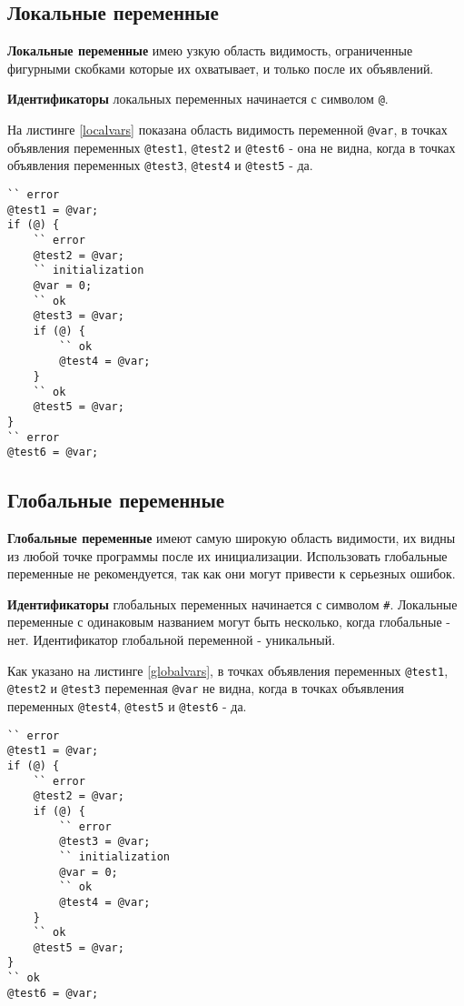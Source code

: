 \documentclass[a4paper, 14pt]{extarticle}
\begin{document}
\subsection{Локальные переменные}

\textbf{Локальные переменные} имею узкую область видимость, ограниченные фигурными скобками которые их охватывает, и только после их объявлений.

{\bf Идентификаторы} локальных переменных начинается с символом \lstinline`@`.

На листинге \ref{localvars} показана область видимость переменной \lstinline`@var`, в точках объявления переменных \lstinline`@test1`, \lstinline`@test2` и \lstinline`@test6` - она не видна, когда в точках объявления переменных \lstinline`@test3`, \lstinline`@test4` и \lstinline`@test5` - да.
\begin{lstlisting}[caption=Область видимости локальных перемен, label=localvars]
`` error
@test1 = @var;
if (@) {
	`` error
	@test2 = @var;
	`` initialization
	@var = 0;
	`` ok
	@test3 = @var;
	if (@) {
		`` ok
		@test4 = @var;
	}
	`` ok
	@test5 = @var;
}
`` error
@test6 = @var;
\end{lstlisting}

\subsection{Глобальные переменные}

\textbf{Глобальные переменные} имеют самую широкую область видимости, их видны из любой точке программы после их инициализации. Использовать глобальные переменные не рекомендуется, так как они могут привести к серьезных ошибок.

{\bf Идентификаторы} глобальных переменных начинается с символом {\color{blue2}\lstinline`#`}. Локальные переменные с одинаковым названием могут быть несколько, когда глобальные - нет. Идентификатор глобальной переменной - уникальный.

Как указано на листинге \ref{globalvars}, в точках объявления переменных \lstinline`@test1`, \lstinline`@test2` и \lstinline`@test3` переменная \lstinline`@var` не видна, когда в точках объявления переменных \lstinline`@test4`, \lstinline`@test5` и \lstinline`@test6` - да.

\begin{lstlisting}[caption=Область видимости глобальных перемен, label=globalvars]
`` error
@test1 = @var;
if (@) {
	`` error
	@test2 = @var;
	if (@) {
		`` error
		@test3 = @var;
		`` initialization
		@var = 0;
		`` ok
		@test4 = @var;
	}
	`` ok
	@test5 = @var;
}
`` ok
@test6 = @var;
\end{lstlisting}
\end{document}
